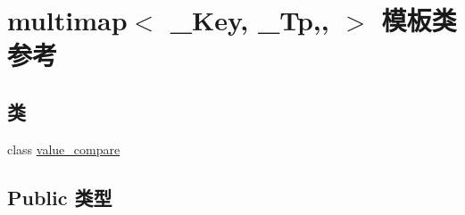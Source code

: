 \hypertarget{classmultimap}{}\section{multimap$<$ \+\_\+\+Key, \+\_\+\+Tp,, $>$ 模板类 参考}
\label{classmultimap}
\subsection*{类}
\begin{DoxyCompactItemize}
\item 
class \hyperlink{classmultimap_1_1value__compare}{value\+\_\+compare}
\end{DoxyCompactItemize}
\subsection*{Public 类型}

